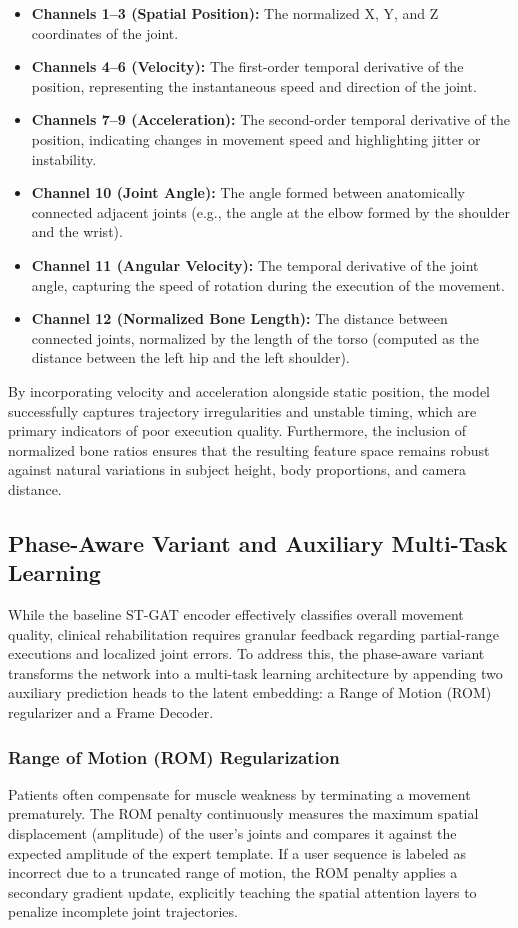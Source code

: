 \begin{itemize}
    \item \textbf{Channels 1--3 (Spatial Position):} The normalized X, Y, and Z coordinates of the joint.
    \item \textbf{Channels 4--6 (Velocity):} The first-order temporal derivative of the position, representing the instantaneous speed and direction of the joint.
    \item \textbf{Channels 7--9 (Acceleration):} The second-order temporal derivative of the position, indicating changes in movement speed and highlighting jitter or instability.
    \item \textbf{Channel 10 (Joint Angle):} The angle formed between anatomically connected adjacent joints (e.g., the angle at the elbow formed by the shoulder and the wrist).
    \item \textbf{Channel 11 (Angular Velocity):} The temporal derivative of the joint angle, capturing the speed of rotation during the execution of the movement.
    \item \textbf{Channel 12 (Normalized Bone Length):} The distance between connected joints, normalized by the length of the torso (computed as the distance between the left hip and the left shoulder).
\end{itemize}

By incorporating velocity and acceleration alongside static position, the model successfully captures trajectory irregularities and unstable timing, which are primary indicators of poor execution quality. Furthermore, the inclusion of normalized bone ratios ensures that the resulting feature space remains robust against natural variations in subject height, body proportions, and camera distance.

\subsection{Phase-Aware Variant and Auxiliary Multi-Task Learning}
While the baseline ST-GAT encoder effectively classifies overall movement quality, clinical rehabilitation requires granular feedback regarding partial-range executions and localized joint errors. To address this, the phase-aware variant transforms the network into a multi-task learning architecture by appending two auxiliary prediction heads to the latent embedding: a Range of Motion (ROM) regularizer and a Frame Decoder.

\subsubsection*{Range of Motion (ROM) Regularization}
Patients often compensate for muscle weakness by terminating a movement prematurely. The ROM penalty continuously measures the maximum spatial displacement (amplitude) of the user’s joints and compares it against the expected amplitude of the expert template. If a user sequence is labeled as incorrect due to a truncated range of motion, the ROM penalty applies a secondary gradient update, explicitly teaching the spatial attention layers to penalize incomplete joint trajectories.

